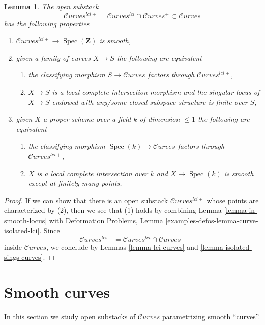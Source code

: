 \documentclass{stacks-project}
\theoremstyle{plain}
\newtheorem{lemma}[subsection]{Lemma}
\theoremstyle{definition}
\theoremstyle{remark}
\numberwithin{equation}{subsection}
\def\Spec{\mathop{\mathrm{Spec}}}
\def\Curvesstack{\mathcal{C}\!\mathit{urves}}
\begin{document}
\begin{lemma}
\label{lemma-big-smooth-part-curves}
The open substack
$$
\Curvesstack^{lci+} =
\Curvesstack^{lci} \cap \Curvesstack^{+}
\subset \Curvesstack
$$
has the following properties
\begin{enumerate}
\item $\Curvesstack^{lci+} \to \Spec(\mathbf{Z})$ is smooth,
\item given a family of curves $X \to S$ the following are equivalent
\begin{enumerate}
\item the classifying morphism $S \to \Curvesstack$ factors through
$\Curvesstack^{lci+}$,
\item $X \to S$ is a local complete intersection morphism and
the singular locus of $X \to S$ endowed with any/some closed subspace
structure is finite over $S$,
\end{enumerate}
\item given $X$ a proper scheme over a field $k$ of dimension $\leq 1$
the following are equivalent
\begin{enumerate}
\item the classifying morphism $\Spec(k) \to \Curvesstack$ factors
through $\Curvesstack^{lci+}$,
\item $X$ is a local complete intersection over $k$ and
$X \to \Spec(k)$ is smooth except at finitely many points.
\end{enumerate}
\end{enumerate}
\end{lemma}

\begin{proof}
If we can show that there is an open substack $\Curvesstack^{lci+}$
whose points are characterized by (2), then we see that
(1) holds by combining Lemma \ref{lemma-in-smooth-locus} with
Deformation Problems, Lemma \ref{examples-defos-lemma-curve-isolated-lci}.
Since
$$
\Curvesstack^{lci+} = \Curvesstack^{lci} \cap \Curvesstack^{+}
$$
inside $\Curvesstack$, we conclude by
Lemmas \ref{lemma-lci-curves} and \ref{lemma-isolated-sings-curves}.
\end{proof}




\section{Smooth curves}
\label{section-smooth-curves}

\noindent
In this section we study open substacks of $\Curvesstack$
parametrizing smooth ``curves''.
\end{document}
